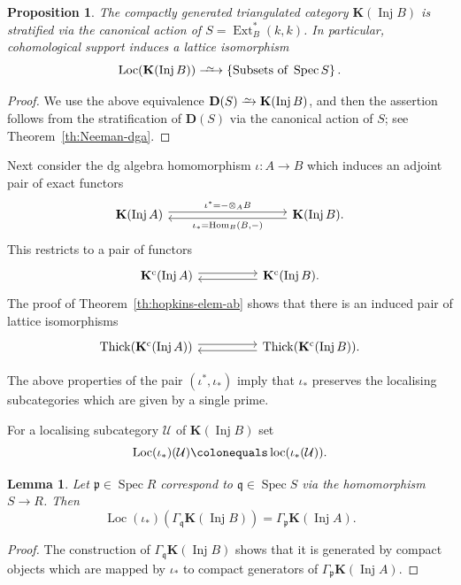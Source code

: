 \documentclass{amsart}[a4]
\newtheorem{lemma}[theorem]{Lemma}
\newtheorem{proposition}[theorem]{Proposition}
\theoremstyle{definition}
\theoremstyle{remark}
\numberwithin{equation}{section}
\newcommand{\Ext}{\operatorname{Ext}}
\newcommand{\Hom}{\operatorname{Hom}}
\newcommand{\Inj}{\operatorname{Inj}}
\newcommand{\loc}{\operatorname{loc}}
\newcommand{\Loc}{\operatorname{Loc}}
\newcommand{\Spec}{\operatorname{Spec}}
\newcommand{\Thick}{\operatorname{Thick}}
\newcommand{\iso}{\xrightarrow{\raisebox{-.6ex}[0ex][0ex]{$\scriptstyle{\sim}$}}}
\newcommand{\longiso}{\xrightarrow{\
    \raisebox{-.6ex}[0ex][0ex]{$\scriptstyle{\sim}$}\ }}
\newcommand{\cat}{\mathcal}
\newcommand{\bfD}{\mathbf D}
\newcommand{\bfK}{\mathbf K}
\newcommand{\fp}{\mathfrak{p}}
\newcommand{\fq}{\mathfrak{q}}
\let\Gamma\varGamma
\begin{document}
\begin{proposition}\label{pr:BGG-dga-strat}
  The compactly generated triangulated category $\bfK(\Inj B)$ is
  stratified via the canonical action of $S=\Ext_B^*(k,k)$. In
  particular, cohomological support induces a lattice isomorphism
  \begin{equation*}
    \Loc(\bfK(\Inj B))\longiso\{\text{Subsets of }\Spec
    S\}\,.
  \end{equation*}
\end{proposition}
\begin{proof}
  We use the above equivalence $\bfD(S)\iso \bfK(\Inj B)$, and then the
  assertion follows from the stratification of $\bfD(S)$ via the
  canonical action of $S$; see Theorem~\ref{th:Neeman-dga}.
\end{proof}


Next consider the dg algebra homomorphism $\iota\colon A\to B$ which
induces an adjoint pair of
exact functors
\begin{equation*}
\begin{tikzcd}[column sep = huge]
  \bfK(\Inj A) \ar[rr,yshift=2.5,"\iota^*=-\otimes_A B"] &&
  \ar[ll,yshift=-2.5,"{\iota_*=\Hom_B(B,-)}"] \bfK(\Inj B).
\end{tikzcd}
\end{equation*}
This restricts to a pair of functors
\begin{equation*}
\begin{tikzcd}
\bfK^{\mathrm c}(\Inj A) \ar[rr, yshift=2.5] &&  \ar[ll, yshift=-2.5,]
\bfK^{\mathrm c}(\Inj B).
\end{tikzcd}
\end{equation*}
The proof of Theorem~\ref{th:hopkins-elem-ab} shows that there is an
induced pair of lattice isomorphisms
\begin{equation*}
\begin{tikzcd}
\Thick(\bfK^{\mathrm c}(\Inj A)) \ar[rr,yshift=2.5] &&  \ar[ll,yshift=-2.5]
\Thick(\bfK^{\mathrm c}(\Inj B)).
\end{tikzcd}
\end{equation*}

The above properties of the pair $(\iota^*,\iota_*)$ imply that
$\iota_*$ preserves the localising subcategories which are given by a
single prime.

For a localising subcategory $\cat U$ of $\bfK(\Inj B)$
set \[\Loc(\iota_*)(\cat U)\colonequals\loc(\iota_*(\cat U)).\]

\begin{lemma}\label{le:minimal-loc-ind-res}
 Let $\fp\in\Spec R$ correspond to $\fq\in\Spec S$ via the
 homomorphism $S\to R$. Then
\[\Loc(\iota_*)(\Gamma_\fq\bfK(\Inj B))=\Gamma_\fp\bfK(\Inj A).\]
\end{lemma}
\begin{proof}
The construction of $\Gamma_\fq\bfK(\Inj B)$ shows that it
is generated by compact objects which are mapped by $\iota_*$ to
compact generators of $\Gamma_\fp\bfK(\Inj A)$.
\end{proof}
\end{document}

